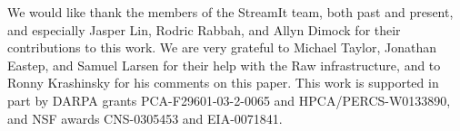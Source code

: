 \acks 
We would like thank the members of the StreamIt team, both past and
present, and especially Jasper Lin, Rodric Rabbah, and Allyn Dimock
for their contributions to this work.  We are very grateful to Michael
Taylor, Jonathan Eastep, and Samuel Larsen for their help with the Raw
infrastructure, and to Ronny Krashinsky for his comments on this
paper.  This work is supported in part by DARPA grants
PCA-F29601-03-2-0065 and HPCA/PERCS-W0133890, and NSF awards
CNS-0305453 and EIA-0071841.
